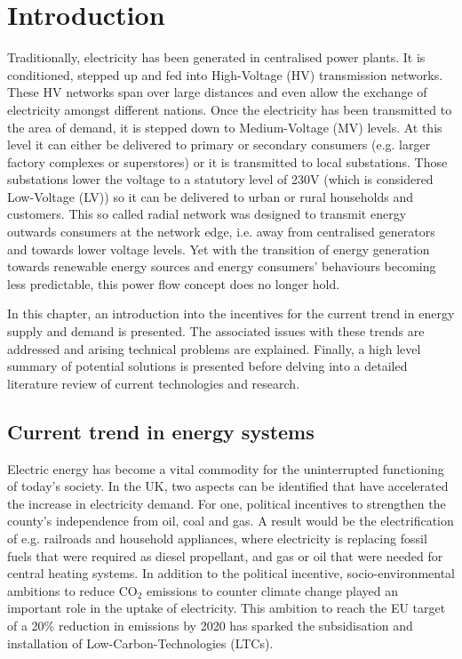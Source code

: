 \chapter{Introduction}

Traditionally, electricity has been generated in centralised power plants.
It is conditioned, stepped up and fed into High-Voltage (HV) transmission networks.
These HV networks span over large distances and even allow the exchange of electricity amongst different nations.
Once the electricity has been transmitted to the area of demand, it is stepped down to Medium-Voltage (MV) levels.
At this level it can either be delivered to primary or secondary consumers (e.g. larger factory complexes or superstores) or it is transmitted to local substations.
Those substations lower the voltage to a statutory level of 230V (which is considered Low-Voltage (LV)) so it can be delivered to urban or rural households and customers.
This so called radial network was designed to transmit energy outwards consumers at the network edge, i.e. away from centralised generators and towards lower voltage levels.
Yet with the transition of energy generation towards renewable energy sources and energy consumers' behaviours becoming less predictable, this power flow concept does no longer hold.

In this chapter, an introduction into the incentives for the current trend in energy supply and demand is presented. The associated issues with these trends are addressed and arising technical problems are explained. Finally, a high level summary of potential solutions is presented before delving into a detailed literature review of current technologies and research.

\section{Current trend in energy systems}

Electric energy has become a vital commodity for the uninterrupted functioning of today's society.
In the UK, two aspects can be identified that have accelerated the increase in electricity demand.
For one, political incentives to strengthen the county's independence from oil, coal and gas.
A result would be the electrification of e.g. railroads and household appliances, where electricity is replacing fossil fuels that were required as diesel propellant, and gas or oil that were needed for central heating systems.
In addition to the political incentive, socio-environmental ambitions to reduce $\text{CO}_2$ emissions to counter climate change played an important role in the uptake of electricity.
This ambition to reach the EU target of a 20\% reduction in emissions by 2020 has sparked the subsidisation and installation of Low-Carbon-Technologies (LTCs).

